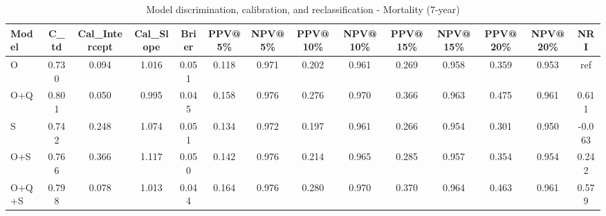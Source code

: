 \begin{table}[htbp]
\centering
\small
\caption{Model discrimination, calibration, and reclassification - Mortality (7-year)}
\label{tab:perf_mortality_7y}
\begin{tabular}{lccccccccccccc}
\toprule
Model & C\_td & Cal\_Intercept & Cal\_Slope & Brier & PPV@5\% & NPV@5\% & PPV@10\% & NPV@10\% & PPV@15\% & NPV@15\% & PPV@20\% & NPV@20\% & NRI \\
\midrule
O & 0.730 & 0.094 & 1.016 & 0.051 & 0.118 & 0.971 & 0.202 & 0.961 & 0.269 & 0.958 & 0.359 & 0.953 & ref \\
O+Q & 0.801 & 0.050 & 0.995 & 0.045 & 0.158 & 0.976 & 0.276 & 0.970 & 0.366 & 0.963 & 0.475 & 0.961 & 0.611 \\
S & 0.742 & 0.248 & 1.074 & 0.051 & 0.134 & 0.972 & 0.197 & 0.961 & 0.266 & 0.954 & 0.301 & 0.950 & -0.063 \\
O+S & 0.766 & 0.366 & 1.117 & 0.050 & 0.142 & 0.976 & 0.214 & 0.965 & 0.285 & 0.957 & 0.354 & 0.954 & 0.242 \\
O+Q+S & 0.798 & 0.078 & 1.013 & 0.044 & 0.164 & 0.976 & 0.280 & 0.970 & 0.370 & 0.964 & 0.463 & 0.961 & 0.579 \\
\bottomrule
\end{tabular}
\end{table}